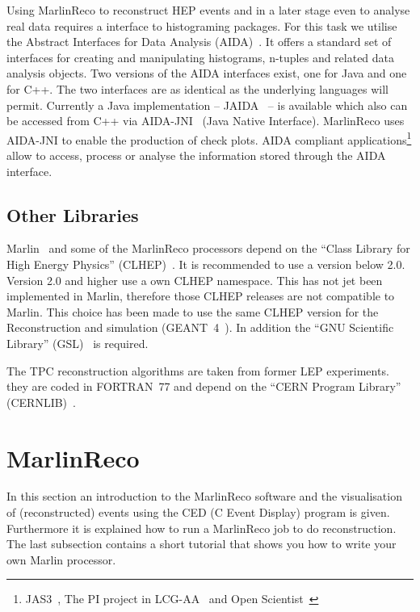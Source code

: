 Using MarlinReco to reconstruct HEP events and in a later stage even to
analyse real data requires a interface to histograming packages. 
For this task we utilise the Abstract Interfaces for Data Analysis
(AIDA)~\cite{ref_aida}. It offers a standard set of interfaces for creating 
and manipulating histograms, n-tuples and related data analysis objects.
Two versions of the AIDA interfaces exist, one for Java and
one for C++. The two interfaces are as identical as the underlying
languages will permit. Currently a Java implementation -- 
JAIDA~\cite{ref_jaida} -- is available which also can be accessed from C++ 
via AIDA-JNI~\cite{ref_aidajni} (Java Native Interface). 
MarlinReco uses AIDA-JNI to enable the production of check plots. 
AIDA compliant applications\footnote{ 
      JAS3~\cite{ref_jas}, The PI project in LCG-AA~\cite{ref_pi} and 
      Open Scientist~\cite{ref_OS}} 
allow to access, process or analyse the information
stored through the AIDA interface. 

\subsection{Other Libraries} \label{sec:otherlibs}

Marlin~\cite{ref_marlin} and some of the MarlinReco processors depend on the
``Class Library for High Energy Physics'' (CLHEP)~\cite{ref_clhep}. 
It is recommended to use a version below 2.0. Version 2.0 and higher use a 
own CLHEP namespace. This has not jet been implemented in Marlin, therefore those
CLHEP releases are not compatible to Marlin. This choice has been 
made to use the same CLHEP version for the Reconstruction and simulation 
(GEANT~4~\cite{ref_geant4}). In addition the ``GNU Scientific Library'' 
(GSL)~\cite{ref_gsl} is required. 

The TPC reconstruction algorithms are taken from former LEP experiments.  
they are coded in FORTRAN~77 and depend on the ``CERN Program Library'' 
(CERNLIB)~\cite{ref_cernlib}. 

\section{MarlinReco}

In this section an introduction to the MarlinReco software and the
visualisation of (reconstructed) events using the 
CED (C Event Display) program is given. Furthermore it is explained how to 
run a MarlinReco job to do reconstruction. The last subsection 
contains a short tutorial that shows you how to write your own Marlin 
processor. 

